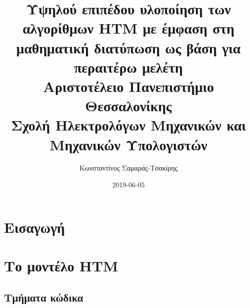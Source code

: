 \documentclass[a4paper,11pt,twoside]{report}
\title{
{Υψηλού επιπέδου υλοποίηση των αλγορίθμων HTM με έμφαση στη μαθηματική διατύπωση ως βάση για περαιτέρω μελέτη}\\
{\large Αριστοτέλειο Πανεπιστήμιο Θεσσαλονίκης}\\
{\large Σχολή Ηλεκτρολόγων Μηχανικών και Μηχανικών Υπολογιστών}
}
\author{Κωνσταντίνος Σαμαράς-Τσακίρης}
\date{2019-06-05}
\begin{document}
\maketitle
%

\tableofcontents{}

\chapter{Εισαγωγή}


\chapter{Το μοντέλο HTM}


\printbibliography

\begin{appendices}
\chapter{Τμήματα κώδικα}

\end{appendices}
\end{document}
